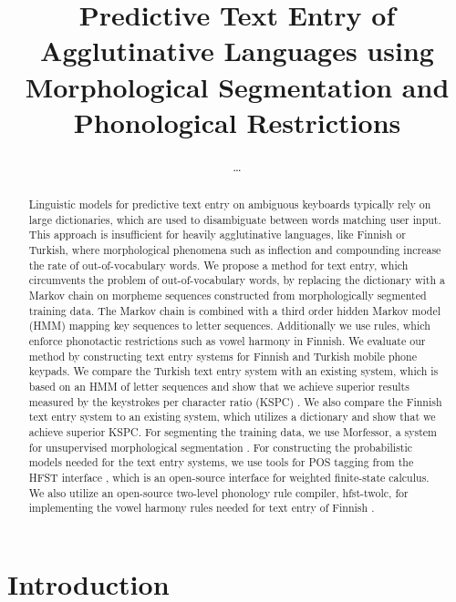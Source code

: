 \documentclass{llncs}
\begin{document}
\title{Predictive Text Entry of Agglutinative Languages using Morphological Segmentation and Phonological Restrictions}

\author{\ldots}
\institute{\ldots}

\maketitle

\begin{abstract}

Linguistic models for predictive text entry on ambiguous keyboards
typically rely on large dictionaries, which are used to disambiguate
between words matching user input. This approach is insufficient for
heavily agglutinative languages, like Finnish or Turkish, where
morphological phenomena such as inflection and compounding increase
the rate of out-of-vocabulary words. We propose a method for text
entry, which circumvents the problem of out-of-vocabulary words, by
replacing the dictionary with a Markov chain on morpheme sequences
constructed from morphologically segmented training data. The Markov
chain is combined with a third order hidden Markov model (HMM) mapping
key sequences to letter sequences. Additionally we use rules, which
enforce phonotactic restrictions such as vowel harmony in Finnish. We
evaluate our method by constructing text entry systems for Finnish and
Turkish mobile phone keypads. We compare the Turkish text entry system
with an existing system, which is based on an HMM of letter sequences
\cite{Tantug:2010} and show that we achieve superior results measured
by the keystrokes per character ratio (KSPC)
\cite{MacKenzie02kspc}. We also compare the Finnish text entry system
to an existing system, which utilizes a dictionary
\cite{silfverberg/2011/cla} and show that we achieve superior
KSPC. For segmenting the training data, we use Morfessor, a system for
unsupervised morphological segmentation \cite{Creutz07ACMTSLP}. For
constructing the probabilistic models needed for the text entry
systems, we use tools for POS tagging from the HFST interface
\cite{Silfverberg/2011}, which is an open-source interface for
weighted finite-state calculus. We also utilize an open-source
two-level phonology rule compiler, hfst-twolc, for implementing the
vowel harmony rules needed for text entry of Finnish \cite{hfst/2011}.

\end{abstract}

\section{Introduction}
\end{document}
